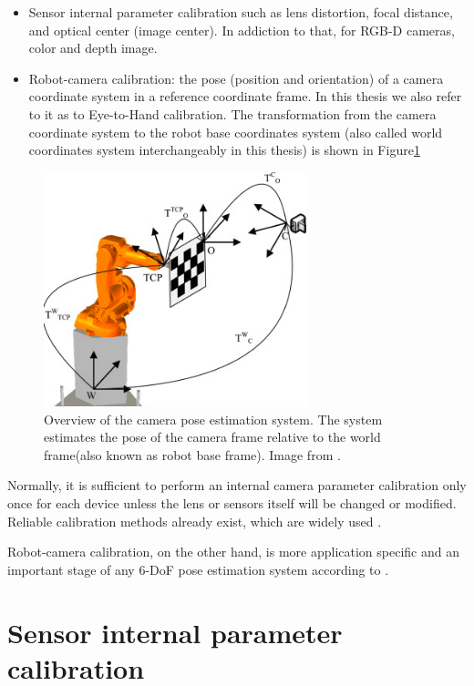 \begin{itemize}
\item Sensor internal parameter calibration such as lens distortion, focal distance, and optical center (image center). In addiction to that, for RGB-D cameras, color and depth image.
\item Robot-camera calibration: the pose (position and orientation) of a camera coordinate system in a reference coordinate frame. In this thesis we also refer to it as to Eye-to-Hand calibration. The transformation from the camera coordinate system to the robot base coordinates system (also called world coordinates system interchangeably in this thesis) is shown in Figure\ref{fig:system0} 

\end{itemize}
\begin{figure}[!h]
\begin{center}
\includegraphics[width=3in]{figures03/system1.png}
\caption{Overview of the camera pose estimation system. The system estimates  the pose of the camera frame relative to the world frame(also known as robot base frame). Image from \cite{autCAL}.}
\label{fig:system0}
\end{center}
\end{figure}

Normally, it is sufficient to perform an internal camera parameter calibration only once for each device unless the lens or sensors itself will be changed or modified. Reliable calibration methods already exist, which are widely used \cite{Zhang} \cite{Tsai}.

Robot-camera calibration, on the other hand, is more application specific and an important stage of any 6-DoF pose estimation system according to \cite{autCAL1} \cite{autCAL2}. 

\section{Sensor internal parameter calibration}

